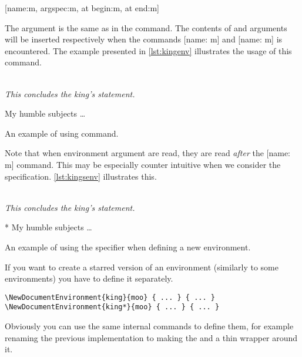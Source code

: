 \begin{lscommand}
  \small
  [name:m, argspec:m, at begin:m, at end:m]
\end{lscommand}
The  argument is the same as in the
 command. The contents of  and  arguments will be inserted respectively when the commands
[name: m] and [name: m] is encountered. The example
presented in \autoref{lst:kingenv} illustrates the usage of this command.
\begin{listing}
  \begin{example}
 {%
  \\[1em]%
  \emph{This concludes
    the king's statement.}%
}

\begin{king}
My humble subjects \ldots
\end{king}
\end{example}
  \caption{An example of using 
    command.}\label{lst:kingenv}
\end{listing}

Note that when environment argument are read, they are read \emph{after} the
[name: m] command. This may be especially counter intuitive when we
consider the  specification. \autoref{lst:kingsenv} illustrates this.
\begin{listing}
  \begin{example}
 {%
  \\[1em]%
  \emph{This concludes
    the king's statement.}%
}

\begin{king}*
My humble subjects \ldots
\end{king}
\end{example}
  \caption{An example of using the  specifier when defining a new
    environment.}\label{lst:kingsenv}
\end{listing}
If you want to create a starred version of an environment (similarly to some
 environments) you have to define it separately.
\begin{verbatim}
\NewDocumentEnvironment{king}{moo} { ... } { ... }
\NewDocumentEnvironment{king*}{moo} { ... } { ... }
\end{verbatim}
Obviously you can use the same internal commands to define them, for example
renaming the previous implementation to  making the
 and  a thin wrapper around it.

